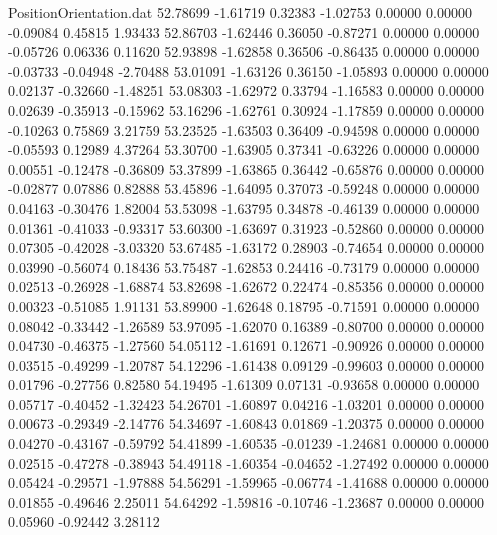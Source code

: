 \begin{filecontents}{PositionOrientation.dat}
  52.78699   -1.61719    0.32383    -1.02753    0.00000    0.00000   -0.09084    0.45815    1.93433
  52.86703   -1.62446    0.36050    -0.87271    0.00000    0.00000   -0.05726    0.06336    0.11620
  52.93898   -1.62858    0.36506    -0.86435    0.00000    0.00000   -0.03733   -0.04948   -2.70488
  53.01091   -1.63126    0.36150    -1.05893    0.00000    0.00000    0.02137   -0.32660   -1.48251
  53.08303   -1.62972    0.33794    -1.16583    0.00000    0.00000    0.02639   -0.35913   -0.15962
  53.16296   -1.62761    0.30924    -1.17859    0.00000    0.00000   -0.10263    0.75869    3.21759
  53.23525   -1.63503    0.36409    -0.94598    0.00000    0.00000   -0.05593    0.12989    4.37264
  53.30700   -1.63905    0.37341    -0.63226    0.00000    0.00000    0.00551   -0.12478   -0.36809
  53.37899   -1.63865    0.36442    -0.65876    0.00000    0.00000   -0.02877    0.07886    0.82888
  53.45896   -1.64095    0.37073    -0.59248    0.00000    0.00000    0.04163   -0.30476    1.82004
  53.53098   -1.63795    0.34878    -0.46139    0.00000    0.00000    0.01361   -0.41033   -0.93317
  53.60300   -1.63697    0.31923    -0.52860    0.00000    0.00000    0.07305   -0.42028   -3.03320
  53.67485   -1.63172    0.28903    -0.74654    0.00000    0.00000    0.03990   -0.56074    0.18436
  53.75487   -1.62853    0.24416    -0.73179    0.00000    0.00000    0.02513   -0.26928   -1.68874
  53.82698   -1.62672    0.22474    -0.85356    0.00000    0.00000    0.00323   -0.51085    1.91131
  53.89900   -1.62648    0.18795    -0.71591    0.00000    0.00000    0.08042   -0.33442   -1.26589
  53.97095   -1.62070    0.16389    -0.80700    0.00000    0.00000    0.04730   -0.46375   -1.27560
  54.05112   -1.61691    0.12671    -0.90926    0.00000    0.00000    0.03515   -0.49299   -1.20787
  54.12296   -1.61438    0.09129    -0.99603    0.00000    0.00000    0.01796   -0.27756    0.82580
  54.19495   -1.61309    0.07131    -0.93658    0.00000    0.00000    0.05717   -0.40452   -1.32423
  54.26701   -1.60897    0.04216    -1.03201    0.00000    0.00000    0.00673   -0.29349   -2.14776
  54.34697   -1.60843    0.01869    -1.20375    0.00000    0.00000    0.04270   -0.43167   -0.59792
  54.41899   -1.60535   -0.01239    -1.24681    0.00000    0.00000    0.02515   -0.47278   -0.38943
  54.49118   -1.60354   -0.04652    -1.27492    0.00000    0.00000    0.05424   -0.29571   -1.97888
  54.56291   -1.59965   -0.06774    -1.41688    0.00000    0.00000    0.01855   -0.49646    2.25011
  54.64292   -1.59816   -0.10746    -1.23687    0.00000    0.00000    0.05960   -0.92442    3.28112

\end{filecontents}
